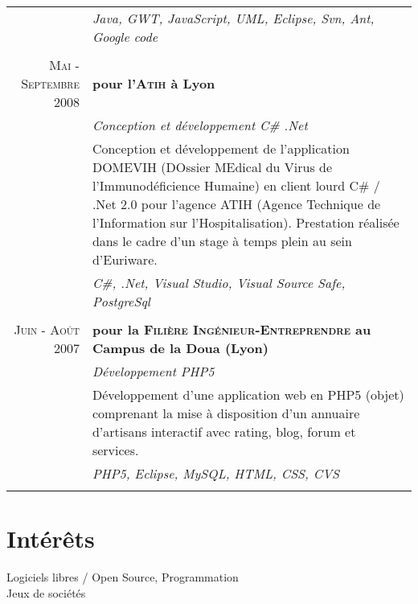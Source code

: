 \documentclass[a4paper,10pt]{article}
\begin{document}
\begin{tabular}{r|p{11cm}}
  & \emph{Java, GWT, JavaScript, UML, Eclipse, Svn, Ant, Google code}                                                    \\
  \multicolumn{2}{c}{}                                                                                                   \\
  \textsc{Mai - Septembre 2008}
  & \textbf{pour l'\textsc{Atih} à Lyon}                                                                                 \\
  & \emph{Conception et développement C\# .Net}                                                                          \\
  & \footnotesize{Conception et développement de l’application DOMEVIH (DOssier MEdical du Virus de l’Immunodéficience Humaine) en client lourd C\# / .Net 2.0 pour l’agence ATIH (Agence Technique de l'Information sur l'Hospitalisation). Prestation réalisée dans le cadre d'un stage à temps plein au sein d'Euriware.}    \\
  & \emph{C\#, .Net, Visual Studio, Visual Source Safe, PostgreSql}                                                      \\
  \multicolumn{2}{c}{}                                                                                                   \\
  \textsc{Juin - Août 2007}
  & \textbf{pour la \textsc{Filière Ingénieur-Entreprendre} au Campus de la Doua (Lyon)}                                 \\
  & \emph{Développement PHP5}                                                                                            \\
  & \footnotesize{Développement d’une application web en PHP5 (objet) comprenant la mise à disposition d’un annuaire d’artisans interactif avec rating, blog, forum et services.}    \\
  & \emph{PHP5, Eclipse, MySQL, HTML, CSS, CVS}                                                                          \\
  \multicolumn{2}{c}{}                                                                                                   \\
\end{tabular}

\section{Intérêts}
Logiciels libres / Open Source, Programmation \\
Jeux de sociétés
\end{document}
